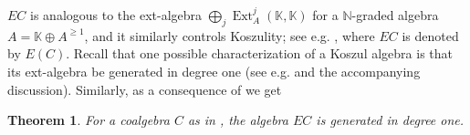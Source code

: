 \documentclass[11pt]{article}
\theoremstyle{plain}
\newtheorem{theorem}[lemma]{Theorem}
\theoremstyle{nonumberplain}
\theoremstyle{plain}
\newtheorem{notation}[lemma]{Notation}
\theoremstyle{nonumberplain}
\newcommand\bK{{\mathbb K}}
\newcommand\bN{{\mathbb N}}
\DeclareMathOperator{\Ext}{\mathrm{Ext}}
\begin{document}
$EC$ is analogous to the ext-algebra $\bigoplus_j\Ext^j_A(\bK,\bK)$ for a $\bN$-graded algebra $A=\bK\oplus A^{\geq 1}$, and it similarly controls Koszulity; see e.g. \cite{JLS}, where $EC$ is denoted by $E(C)$. Recall
that one possible characterization of a Koszul algebra is that its ext-algebra be generated in degree one (see e.g. \cite[Definition 1 in $\S$ 2.1]{PP} and the accompanying discussion). Similarly, as a consequence of  we get 


\begin{theorem}\label{th.Kosz_better}
  For a coalgebra $C$ as in , the algebra $EC$ is generated in
  degree one.  
\end{theorem}


%
%
\end{document}
